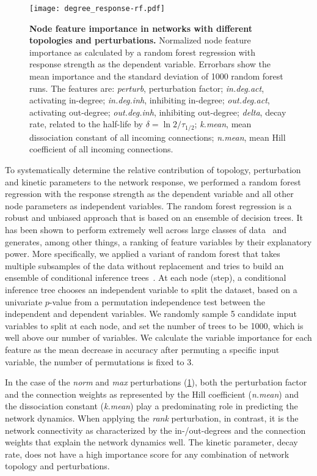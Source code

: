 \begin{figure}[!ht]
\begin{center}
\texttt{[image: degree\_response-rf.pdf]}
\end{center}
\caption[Node feature importance]{
{\bf Node feature importance in networks with different topologies and 
perturbations.} 
Normalized node feature importance as calculated by a random forest regression
with response strength as the dependent variable. Errorbars show the mean 
importance and the standard deviation of 1000 random forest runs.
The features are: \emph{perturb}, perturbation factor; \emph{in.deg.act},
activating in-degree; \emph{in.deg.inh}, inhibiting in-degree;
\emph{out.deg.act}, activating out-degree; \emph{out.deg.inh},
inhibiting out-degree; \emph{delta}, decay rate, related to the half-life
by $\delta = \ln 2 / \tau_{1/2}$; \emph{k.mean}, mean dissociation constant
of all incoming connections; \emph{n.mean}, mean Hill coefficient of all
incoming connections.
}
\label{fig:degree_response_rf}
\end{figure}

To systematically determine the relative contribution
of topology, perturbation and kinetic parameters to the network response,
we performed a random forest regression with the response strength as the
dependent variable and all other node parameters as independent variables.
The random forest regression is a robust and unbiased 
approach that is based on an ensemble of decision trees.
It has been shown to perform extremely well across large 
classes of data~\citep{Caruana2008} and generates, among
other things, a ranking of feature variables by their 
explanatory power. More specifically, we applied a variant
of random forest that
takes multiple subsamples of the data without replacement and
tries to build an ensemble of conditional inference trees~\citep{Strobl2007}. At each node (step), a conditional inference tree
chooses an independent variable to split the dataset, based on a univariate $p$-value from a permutation
independence test between the independent and dependent variables. We randomly sample 5 candidate
input variables to split at each node, and set the number of trees to be 1000, which is well above our
number of variables.
We calculate the variable importance for each feature as the mean decrease in accuracy after permuting a specific input variable, the number of permutations is fixed to 3.

In the case of the \emph{norm} and \emph{max} perturbations
(\ref{fig:degree_response_rf}), 
both the perturbation factor and the connection weights as represented by
the Hill coefficient (\emph{n.mean}) and the dissociation constant 
(\emph{k.mean}) play a predominating role in predicting the network dynamics.
When applying the \emph{rank} perturbation, in contrast, it is the network
connectivity as characterized by the in-/out-degrees and the connection weights
that explain the network dynamics well. The kinetic parameter, decay rate,
does not have a high importance score for any combination of network
topology and perturbations.

